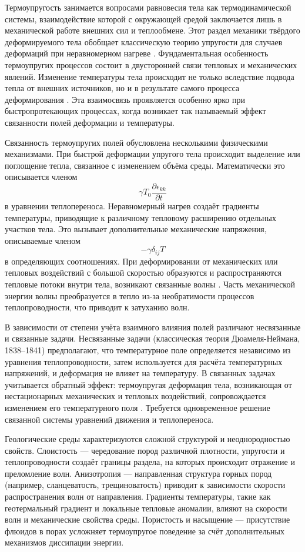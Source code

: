 Термоупругость занимается вопросами равновесия тела как термодинамической системы, взаимодействие которой с окружающей средой заключается лишь в механической работе внешних сил и теплообмене. Этот раздел механики твёрдого деформируемого тела обобщает классическую теорию упругости для случаев деформаций при неравномерном нагреве \cite{Wikipedia}. Фундаментальная особенность термоупругих процессов состоит в двусторонней связи тепловых и механических явлений. Изменение температуры тела происходит не только вследствие подвода тепла от внешних источников, но и в результате самого процесса деформирования \cite{Doklad}. Эта взаимосвязь проявляется особенно ярко при быстропротекающих процессах, когда возникает так называемый эффект связанности полей деформации и температуры.

Связанность термоупругих полей обусловлена несколькими физическими механизмами. При быстрой деформации упругого тела происходит выделение или поглощение тепла, связанное с изменением объёма среды. Математически это описывается членом
\[
\gamma T_0 \frac{\partial \epsilon_{kk}}{\partial t}
\]
в уравнении теплопереноса. Неравномерный нагрев создаёт градиенты температуры, приводящие к различному тепловому расширению отдельных участков тела. Это вызывает дополнительные механические напряжения, описываемые членом
\[
- \gamma \delta_{ij} T
\]
в определяющих соотношениях. При деформировании от механических или тепловых воздействий с большой скоростью образуются и распространяются тепловые потоки внутри тела, возникают связанные волны \cite{Doklad}. Часть механической энергии волны преобразуется в тепло из-за необратимости процессов теплопроводности, что приводит к затуханию волн.

В зависимости от степени учёта взаимного влияния полей различают несвязанные и связанные задачи. Несвязанные задачи (классическая теория Дюамеля-Неймана, 1838–1841) предполагают, что температурное поле определяется независимо из уравнения теплопроводности, затем используется для расчёта температурных напряжений, и деформация не влияет на температуру. В связанных задачах учитывается обратный эффект: термоупругая деформация тела, возникающая от нестационарных механических и тепловых воздействий, сопровождается изменением его температурного поля \cite{Gemo}. Требуется одновременное решение связанной системы уравнений движения и теплопереноса.

Геологические среды характеризуются сложной структурой и неоднородностью свойств. Слоистость — чередование пород различной плотности, упругости и теплопроводности создаёт границы раздела, на которых происходит отражение и преломление волн. Анизотропия — направленная структура горных пород (например, сланцеватость, трещиноватость) приводит к зависимости скорости распространения волн от направления. Градиенты температуры, такие как геотермальный градиент и локальные тепловые аномалии, влияют на скорости волн и механические свойства среды. Пористость и насыщение — присутствие флюидов в порах усложняет термоупругое поведение за счёт дополнительных механизмов диссипации энергии.

